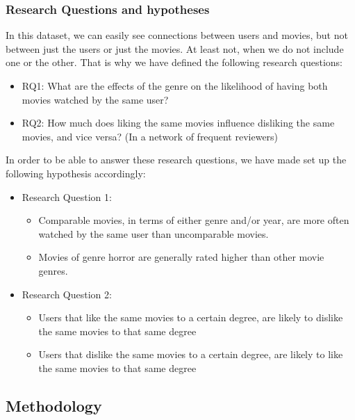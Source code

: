 \documentclass[
  english,
  man,floatsintext]{apa6}
\providecommand{\tightlist}{%
  \setlength{\itemsep}{0pt}\setlength{\parskip}{0pt}}
\begin{document}
\hypertarget{research-questions-and-hypotheses}{%
\subsubsection{Research Questions and hypotheses}\label{research-questions-and-hypotheses}}

In this dataset, we can easily see connections between users and movies, but not between just the users or just the movies. At least not, when we do not include one or the other. That is why we have defined the following research questions:

\begin{itemize}
\tightlist
\item
  RQ1: What are the effects of the genre on the likelihood of having both movies watched by the same user?
\item
  RQ2: How much does liking the same movies influence disliking the same movies, and vice versa? (In a network of frequent reviewers)
\end{itemize}

In order to be able to answer these research questions, we have made set up the following hypothesis accordingly:

\begin{itemize}
\tightlist
\item
  Research Question 1:

  \begin{itemize}
  \tightlist
  \item
    Comparable movies, in terms of either genre and/or year, are more often watched by the same user than uncomparable movies.\\
  \item
    Movies of genre horror are generally rated higher than other movie genres.
  \end{itemize}
\item
  Research Question 2:

  \begin{itemize}
  \tightlist
  \item
    Users that like the same movies to a certain degree, are likely to dislike the same movies to that same degree
  \item
    Users that dislike the same movies to a certain degree, are likely to like the same movies to that same degree
  \end{itemize}
\end{itemize}

\hypertarget{methodology}{%
\subsection{Methodology}\label{methodology}}
\end{document}
